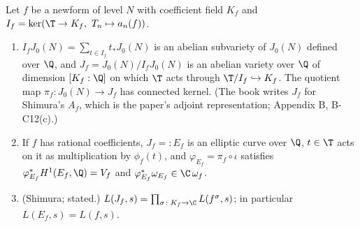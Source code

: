 \begin{theorem}\label{thm:moddeg:shimura-quotient}
Let $f$ be a newform of level $N$ with coefficient field $K_f$ and $I_f=\ker(\T\to K_f,\ T_n\mapsto a_n(f))$.
\begin{enumerate}[label=(\roman*)]
\item $I_fJ_0(N)=\sum_{t\in I_f}t_*J_0(N)$ is an abelian subvariety of $J_0(N)$ defined over $\Q$, and $J_f=J_0(N)/I_fJ_0(N)$ is an abelian variety over $\Q$ of dimension
$[K_f:\Q]$ on which $\T$ acts through $\T/I_f\hookrightarrow K_f$. The quotient map $\pi_f\colon J_0(N)\to J_f$ has connected kernel. (The book writes $J_f$ for Shimura's
$A_f$, which is the paper's adjoint representation; Appendix B, B-C12(c).)
\item If $f$ has rational coefficients, $J_f=:E_f$ is an elliptic curve over $\Q$, $t\in\T$ acts on it as multiplication by $\phi_f(t)$, and $\varphi_{E_f}=\pi_f\circ\iota$ satisfies
$\varphi_{E_f}^*H^1(E_f,\Q)=V_f$ and $\varphi_{E_f}^*\omega_{E_f}\in\C\,\omega_f$.
\item (Shimura; stated.) $L(J_f,s)=\prod_{\sigma\colon K_f\to\C}L(f^\sigma,s)$; in particular $L(E_f,s)=L(f,s)$.
\end{enumerate}
\end{theorem}

